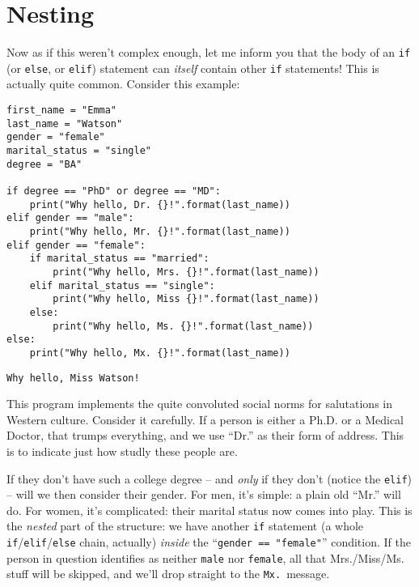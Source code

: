 \section{Nesting}


Now as if this weren't complex enough, let me inform you that the body of an
\texttt{if} (or \texttt{else}, or \texttt{elif}) statement can \textit{itself}
contain other \texttt{if} statements! This is actually quite common. Consider
this example:

\label{salutation}

\begin{Verbatim}[fontsize=\small,samepage=true,frame=single,framesep=3mm]
first_name = "Emma"
last_name = "Watson"
gender = "female"
marital_status = "single"
degree = "BA"

if degree == "PhD" or degree == "MD":
    print("Why hello, Dr. {}!".format(last_name))
elif gender == "male":
    print("Why hello, Mr. {}!".format(last_name))
elif gender == "female":
    if marital_status == "married":
        print("Why hello, Mrs. {}!".format(last_name))
    elif marital_status == "single":
        print("Why hello, Miss {}!".format(last_name))
    else:
        print("Why hello, Ms. {}!".format(last_name))
else:
    print("Why hello, Mx. {}!".format(last_name))
\end{Verbatim}
\vspace{-.2in}

\begin{Verbatim}[fontsize=\small,samepage=true,frame=leftline,framesep=5mm,framerule=1mm]
Why hello, Miss Watson!
\end{Verbatim}

This program implements the quite convoluted social norms for salutations in
Western culture. Consider it carefully. If a person is either a Ph.D. or a
Medical Doctor, that trumps everything, and we use ``Dr.'' as their form of
address. This is to indicate just how studly these people are.

If they don't have such a college degree -- and \textit{only} if they don't
(notice the \texttt{elif}) -- will we then consider their gender. For men, it's
simple: a plain old ``Mr.'' will do. For women, it's complicated: their marital
status now comes into play. This is the \textit{nested} part of the structure:
we have another \texttt{if} statement (a whole
\texttt{if}/\texttt{elif}/\texttt{else} chain, actually) \textit{inside} the
``\texttt{gender == "female"}'' condition. If the person in question identifies
as neither \texttt{male} nor \texttt{female}, all that Mrs./Miss/Ms. stuff will
be skipped, and we'll drop straight to the \texttt{Mx.}~message.

